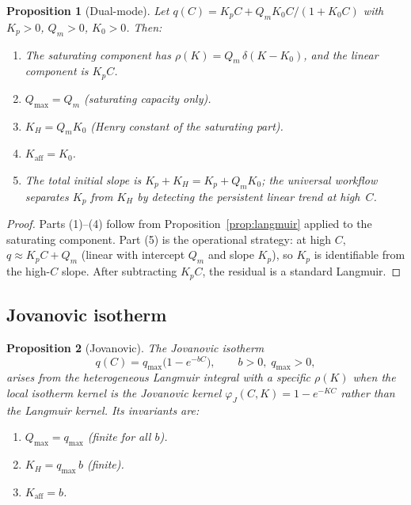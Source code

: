 \documentclass[12pt]{article}
\newtheorem{proposition}{Proposition}
\begin{document}
\begin{proposition}[Dual-mode]
\label{prop:dualmode}
Let $q(C)=K_p C + Q_m K_0 C/(1+K_0 C)$ with $K_p>0$, $Q_m>0$,
$K_0>0$.  Then:
\begin{enumerate}[nosep]
  \item The saturating component has
        $\rho(K)=Q_m\,\delta(K-K_0)$,
        and the linear component is $K_p C$.
  \item $Q_{\max}=Q_m$ (saturating capacity only).
  \item $K_H=Q_m K_0$ (Henry constant of the saturating part).
  \item $K_{\mathrm{aff}}=K_0$.
  \item The total initial slope is $K_p + K_H = K_p + Q_m K_0$;
        the universal workflow separates $K_p$ from $K_H$ by
        detecting the persistent linear trend at high~$C$.
\end{enumerate}
\end{proposition}

\begin{proof}
Parts (1)--(4) follow from Proposition~\ref{prop:langmuir}
applied to the saturating component.  Part (5) is the operational
strategy: at high $C$, $q\approx K_p C + Q_m$ (linear with
intercept $Q_m$ and slope $K_p$), so $K_p$ is identifiable from
the high-$C$ slope.  After subtracting $K_p C$, the residual
is a standard Langmuir.
\end{proof}

\subsection{Jovanovic isotherm}

\begin{proposition}[Jovanovic]
\label{prop:jovanovic}
The Jovanovic isotherm~\cite{Jovanovic1969}
\begin{equation}
  q(C) = q_{\max}\bigl(1 - e^{-bC}\bigr),
  \qquad b>0,\; q_{\max}>0,
  \label{eq:jovanovic}
\end{equation}
arises from the heterogeneous Langmuir integral with a specific
$\rho(K)$ when the local isotherm kernel is the Jovanovic kernel
$\varphi_J(C,K) = 1 - e^{-KC}$ rather than the Langmuir kernel.
Its invariants are:
\begin{enumerate}[nosep]
  \item $Q_{\max} = q_{\max}$ (finite for all $b$).
  \item $K_H = q_{\max}\,b$ (finite).
  \item $K_{\mathrm{aff}} = b$.
\end{enumerate}
\end{proposition}
\end{document}
